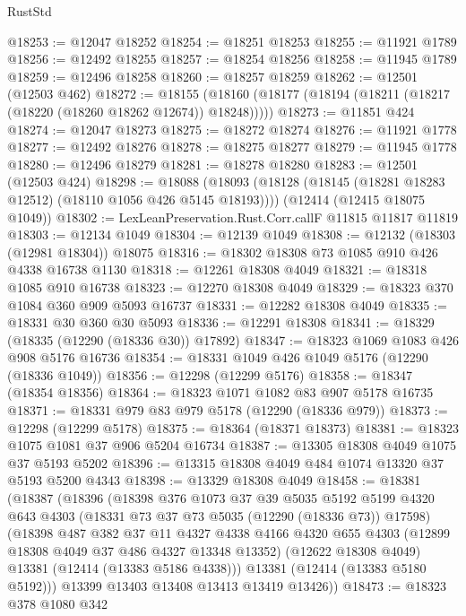 \begin{lexlean}{RustStd}
\begin{coremodule}
{\begin{coremodule}
{{{{{{{{{{{{{{{{{{{{{{{{{{{{{{{{{{{{{{{{{{{{{{{{{{@18253 := @12047 @18252
@18254 := @18251 @18253
@18255 := @11921 @1789
@18256 := @12492 @18255
@18257 := @18254 @18256
@18258 := @11945 @1789
@18259 := @12496 @18258
@18260 := @18257 @18259
@18262 := @12501 (@12503 @462)
@18272 := @18155 (@18160 (@18177 (@18194 (@18211 (@18217 (@18220 (@18260 @18262 @12674)) @18248)))))
@18273 := @11851 @424
@18274 := @12047 @18273
@18275 := @18272 @18274
@18276 := @11921 @1778
@18277 := @12492 @18276
@18278 := @18275 @18277
@18279 := @11945 @1778
@18280 := @12496 @18279
@18281 := @18278 @18280
@18283 := @12501 (@12503 @424)
@18298 := @18088
    (@18093 (@18128 (@18145 (@18281 @18283 @12512) (@18110 @1056 @426 @5145 @18193))))
    (@12414 (@12415 @18075 @1049))
@18302 := LexLeanPreservation.Rust.Corr.callF @11815 @11817 @11819
@18303 := @12134 @1049
@18304 := @12139 @1049
@18308 := @12132 (@18303 (@12981 @18304)) @18075
@18316 := @18302 @18308 @73 @1085 @910 @426 @4338 @16738 @1130
@18318 := @12261 @18308 @4049
@18321 := @18318 @1085 @910 @16738
@18323 := @12270 @18308 @4049
@18329 := @18323 @370 @1084 @360 @909 @5093 @16737
@18331 := @12282 @18308 @4049
@18335 := @18331 @30 @360 @30 @5093
@18336 := @12291 @18308
@18341 := @18329 (@18335 (@12290 (@18336 @30)) @17892)
@18347 := @18323 @1069 @1083 @426 @908 @5176 @16736
@18354 := @18331 @1049 @426 @1049 @5176 (@12290 (@18336 @1049))
@18356 := @12298 (@12299 @5176)
@18358 := @18347 (@18354 @18356)
@18364 := @18323 @1071 @1082 @83 @907 @5178 @16735
@18371 := @18331 @979 @83 @979 @5178 (@12290 (@18336 @979))
@18373 := @12298 (@12299 @5178)
@18375 := @18364 (@18371 @18373)
@18381 := @18323 @1075 @1081 @37 @906 @5204 @16734
@18387 := @13305 @18308 @4049 @1075 @37 @5193 @5202
@18396 := @13315 @18308 @4049 @484 @1074 @13320 @37 @5193 @5200 @4343
@18398 := @13329 @18308 @4049
@18458 := @18381
    (@18387
      (@18396
        (@18398
          @376
          @1073
          @37
          @39
          @5035
          @5192
          @5199
          @4320
          @643
          @4303
          (@18331 @73 @37 @73 @5035 (@12290 (@18336 @73)) @17598)
          (@18398
            @487
            @382
            @37
            @11
            @4327
            @4338
            @4166
            @4320
            @655
            @4303
            (@12899 @18308 @4049 @37 @486 @4327 @13348 @13352)
            (@12622 @18308 @4049)
            @13381
            (@12414 (@13383 @5186 @4338)))
          @13381
          (@12414 (@13383 @5180 @5192)))
        @13399
        @13403
        @13408
        @13413
        @13419
        @13426))
@18473 := @18323
    @378
    @1080
    @342
}}}}}}}}}}}}}}}}}}}}}}}}}}}}}}}}}}}}}}}}}}}}}}}}}}
\end{coremodule}}
\end{coremodule}
\end{lexlean}
